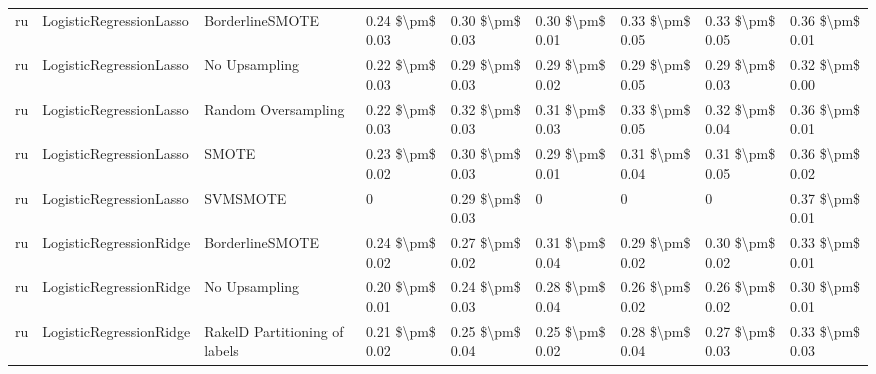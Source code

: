 \begin{tabular}{lllllllll}
      ru &         LogisticRegressionLasso &               BorderlineSMOTE & 0.24 \$\textbackslash pm\$ 0.03 &           0.30 \$\textbackslash pm\$ 0.03 &       0.30 \$\textbackslash pm\$ 0.01 &        0.33 \$\textbackslash pm\$ 0.05 &                         0.33 \$\textbackslash pm\$ 0.05 &     0.36 \$\textbackslash pm\$ 0.01 \\
      ru &         LogisticRegressionLasso &                 No Upsampling & 0.22 \$\textbackslash pm\$ 0.03 &           0.29 \$\textbackslash pm\$ 0.03 &       0.29 \$\textbackslash pm\$ 0.02 &        0.29 \$\textbackslash pm\$ 0.05 &                         0.29 \$\textbackslash pm\$ 0.03 &     0.32 \$\textbackslash pm\$ 0.00 \\
      ru &         LogisticRegressionLasso &           Random Oversampling & 0.22 \$\textbackslash pm\$ 0.03 &           0.32 \$\textbackslash pm\$ 0.03 &       0.31 \$\textbackslash pm\$ 0.03 &        0.33 \$\textbackslash pm\$ 0.05 &                         0.32 \$\textbackslash pm\$ 0.04 &     0.36 \$\textbackslash pm\$ 0.01 \\
      ru &         LogisticRegressionLasso &                         SMOTE & 0.23 \$\textbackslash pm\$ 0.02 &           0.30 \$\textbackslash pm\$ 0.03 &       0.29 \$\textbackslash pm\$ 0.01 &        0.31 \$\textbackslash pm\$ 0.04 &                         0.31 \$\textbackslash pm\$ 0.05 &     0.36 \$\textbackslash pm\$ 0.02 \\
      ru &         LogisticRegressionLasso &                      SVMSMOTE &               0 &           0.29 \$\textbackslash pm\$ 0.03 &                     0 &                      0 &                                       0 &     0.37 \$\textbackslash pm\$ 0.01 \\
      ru &         LogisticRegressionRidge &               BorderlineSMOTE & 0.24 \$\textbackslash pm\$ 0.02 &           0.27 \$\textbackslash pm\$ 0.02 &       0.31 \$\textbackslash pm\$ 0.04 &        0.29 \$\textbackslash pm\$ 0.02 &                         0.30 \$\textbackslash pm\$ 0.02 &     0.33 \$\textbackslash pm\$ 0.01 \\
      ru &         LogisticRegressionRidge &                 No Upsampling & 0.20 \$\textbackslash pm\$ 0.01 &           0.24 \$\textbackslash pm\$ 0.03 &       0.28 \$\textbackslash pm\$ 0.04 &        0.26 \$\textbackslash pm\$ 0.02 &                         0.26 \$\textbackslash pm\$ 0.02 &     0.30 \$\textbackslash pm\$ 0.01 \\
      ru &         LogisticRegressionRidge & RakelD Partitioning of labels & 0.21 \$\textbackslash pm\$ 0.02 &           0.25 \$\textbackslash pm\$ 0.04 &       0.25 \$\textbackslash pm\$ 0.02 &        0.28 \$\textbackslash pm\$ 0.04 &                         0.27 \$\textbackslash pm\$ 0.03 &     0.33 \$\textbackslash pm\$ 0.03 \\

\end{tabular}
